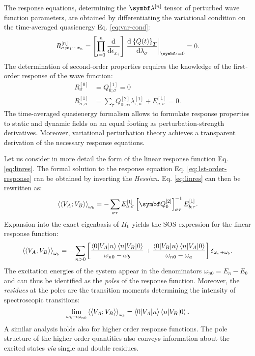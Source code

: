 The response equations, determining the $\vect{\lambda}^{[n]}$ tensor of
perturbed wave function parameters, are obtained by differentiating the
variational condition on the time-averaged quasienergy Eq.
\eqref{eq:var-cond}:\autocite{Olsen1985-nr, Helgaker1992-ph, Christiansen1998-pe}
\begin{equation}
 R_{\sigma;x_1\cdots x_n}^{[n]} = \left[\prod_{i=1}^n \deriv{}{\epsilon_{x_i}}\right]
\left. \deriv{\aveQ}{\lambda_\sigma}\right|_{\vect{\epsilon}=0} = 0.
\end{equation}
The determination of second-order properties requires the knowledge of
the first-order response of the wave function:
\begin{subequations}
 \begin{align}
 R_{\sigma}^{[0]} &= Q_{0;\sigma}^{[1]} = 0 \\
 R_{\sigma;a}^{[1]} &= \sum_{\tau}Q_{0;\sigma\tau}^{[2]}\lambda_{\tau;a}^{[1]} + E_{a;\sigma}^{[1]} = 0.
 \label{eq:1st-order-response}
 \end{align}
\end{subequations}
The time-averaged quasienergy formalism allows to formulate response
properties to static and dynamic fields on an equal footing as
perturbation-strength derivatives.
Moreover, variational perturbation theory achieves a transparent
derivation of the necessary response equations.\autocite{Helgaker1992-ph}

Let us consider in more detail the form of the linear response function
Eq. \eqref{eq:linres}. The formal solution to the response equation Eq.
\eqref{eq:1st-order-response} can be obtained by inverting the
\emph{Hessian}. Eq. \eqref{eq:linres} can then be rewritten as:
\begin{equation}
  \response{V_A}{V_B}{\omega_b}
  =
   -\sum_{\sigma\tau}
   E^{[1]}_{a;\sigma}
   \left[\mat{Q}^{[2]}_{0}\right]^{-1}_{\sigma\tau}
   E^{[1]}_{b;\tau}.
\end{equation}
Expansion into the exact eigenbasis of $H_0$ yields the
\gls{SOS} expression for the linear response function:
\begin{equation}
  \Braket{\Braket{V_A; V_B}}_{\omega_b}
  =
  -\sum_{n>0}\left[
  \frac{\braket{0|V_A|n}\braket{n|V_B|0}}{\omega_{n0}-\omega_b}
  +
  \frac{\braket{0|V_B|n}\braket{n|V_A|0}}{\omega_{n0}-\omega_a}
  \right]\delta_{\omega_a+\omega_b}.
\end{equation}
The excitation energies of the system appear in the denominators
$\omega_{n0} = E_n - E_0$ and can thus be identified as the \emph{poles}
of the response function. Moreover, the \emph{residues} at
the poles are the transition moments determining the intensity of
spectroscopic transitions:
\begin{equation}
  \lim_{\omega_b\rightarrow\omega_{n0}}
  \Braket{\Braket{V_A; V_B}}_{\omega_b}
  = \braket{0|V_A|n}\braket{n|V_B|0}.
\end{equation}
A similar analysis holds also for higher order response functions. The
pole structure of the higher order quantities also conveys information
about the excited states \emph{via} single and double
residues.\autocite{Olsen1985-nr, Christiansen1998-pe, Helgaker2012-cz}

